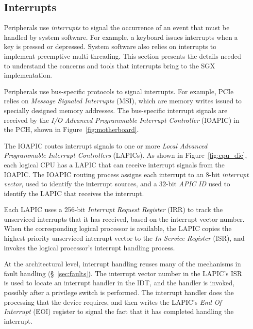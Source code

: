 \subsection{Interrupts}
\label{sec:interrupts}

Peripherals use \textit{interrupts} to signal the occurrence of an event that
must be handled by system software. For example, a keyboard issues interrupts
when a key is pressed or depressed. System software also relies on interrupts
to implement preemptive multi-threading. This section presents the details
needed to understand the concerns and tools that interrupts bring to the SGX
implementation.


Peripherals use bus-specific protocols to signal interrupts. For example, PCIe
relies on \textit{Message Signaled Interrupts} (MSI), which are memory writes
issued to specially designed memory addresses. The bus-specific interrupt
signals are received by the \textit{I/O Advanced Programmable Interrupt
Controller} (IOAPIC) in the PCH, shown in Figure~\ref{fig:motherboard}.


The IOAPIC routes interrupt signals to one or more \textit{Local Advanced
Programmable Interrupt Controllers} (LAPICs). As shown in
Figure~\ref{fig:cpu_die}, each logical CPU has a LAPIC that can receive
interrupt signals from the IOAPIC. The IOAPIC routing process assigns each
interrupt to an 8-bit \textit{interrupt vector}, used to identify the interrupt
sources, and a 32-bit \textit{APIC ID} used to identify the LAPIC that receives
the interrupt.


Each LAPIC uses a 256-bit \textit{Interrupt Request Register} (IRR) to track
the unserviced interrupts that it has received, based on the interrupt vector
number. When the corresponding logical processor is available, the LAPIC copies
the highest-priority unserviced interrupt vector to the
\textit{In-Service Register} (ISR), and invokes the logical processor's
interrupt handling process.


At the architectural level, interrupt handling reuses many of the mechanisms in
fault handling (\S~\ref{sec:faults}). The interrupt vector number in the
LAPIC's ISR is used to locate an interrupt handler in the IDT, and the handler
is invoked, possibly after a privilege switch is performed. The interrupt
handler does the processing that the device requires, and then writes the
LAPIC's \textit{End Of Interrupt} (EOI) register to signal the fact that it has
completed handling the interrupt.

